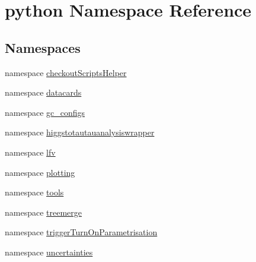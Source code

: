 \hypertarget{namespacepython}{
\section{python Namespace Reference}
\label{namespacepython}
}
\subsection*{Namespaces}
\begin{DoxyCompactItemize}
\item 
namespace \hyperlink{namespacepython_1_1checkoutScriptsHelper}{checkoutScriptsHelper}
\item 
namespace \hyperlink{namespacepython_1_1datacards}{datacards}
\item 
namespace \hyperlink{namespacepython_1_1gc__configs}{gc\_\-configs}
\item 
namespace \hyperlink{namespacepython_1_1higgstotautauanalysiswrapper}{higgstotautauanalysiswrapper}
\item 
namespace \hyperlink{namespacepython_1_1lfv}{lfv}
\item 
namespace \hyperlink{namespacepython_1_1plotting}{plotting}
\item 
namespace \hyperlink{namespacepython_1_1tools}{tools}
\item 
namespace \hyperlink{namespacepython_1_1treemerge}{treemerge}
\item 
namespace \hyperlink{namespacepython_1_1triggerTurnOnParametrisation}{triggerTurnOnParametrisation}
\item 
namespace \hyperlink{namespacepython_1_1uncertainties}{uncertainties}
\end{DoxyCompactItemize}
